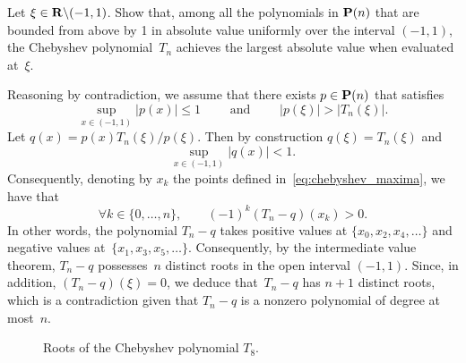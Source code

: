 \begin{exercise}
    \label{exercise:auxiliary_chebyshev}
    Let $\xi \in \mathbf R \backslash (-1, 1)$.
    Show that, among all the polynomials in $\mathbf P(n)$ that are bounded from above by 1 in absolute value uniformly over the interval $(-1, 1)$,
    the Chebyshev polynomial~$T_n$ achieves the largest absolute value when evaluated at~$\xi$.
\end{exercise}
\begin{solution}
    Reasoning by contradiction,
    we assume that there exists $p \in \mathbf P(n)$ that satisfies
    \[
        \sup_{x \in (-1, 1)} \lvert p(x) \rvert \leq 1
        \qquad \text{ and } \qquad \lvert p(\xi) \rvert > \lvert T_n(\xi) \rvert.
    \]
    Let $q(x) = p(x) T_n(\xi) / p(\xi)$.
    Then by construction $q(\xi) = T_n(\xi)$
    and
    \[
       \sup_{x \in (-1, 1)} \lvert q(x) \rvert < 1.
    \]
    Consequently, denoting by $x_k$ the points defined in~\eqref{eq:chebyshev_maxima},
    we have that
    \[
        \forall k \in \{0, \dotsc, n\}, \qquad
        (-1)^k (T_n - q)(x_k) > 0.
    \]
    In other words, the polynomial $T_n - q$ takes positive values at $\{x_0, x_2, x_4, \dotsc\}$ and negative values at~$\{x_1, x_3, x_5, \dotsc\}$.
    Consequently, by the intermediate value theorem,
    $T_n - q$ possesses~$n$ distinct roots in the open interval $(-1, 1)$.
    Since, in addition, $(T_n - q)(\xi) = 0$,
    we deduce that~$T_n - q$ has $n+1$ distinct roots,
    which is a contradiction given that $T_n - q$ is a nonzero polynomial of degree at most~$n$.
\end{solution}

\begin{figure}
    \centering
    \caption{Roots of the Chebyshev polynomial $T_8$.}
    \label{fig:chebyshev_roots}
\end{figure}

